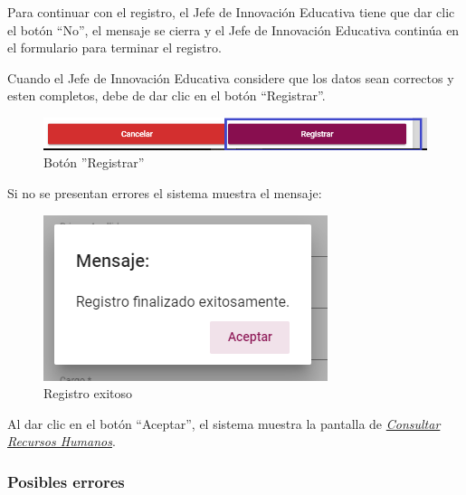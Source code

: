             Para continuar con el registro, el Jefe de Innovación Educativa tiene que  dar clic el botón “No”, el mensaje se cierra y el Jefe de Innovación Educativa continúa en el formulario para terminar el registro.

            Cuando el Jefe de Innovación Educativa considere que los datos sean correctos y esten completos, debe de dar clic en el botón “Registrar”.

            \begin{figure}[H]
                \centering
                \hypertarget{btnreg}{\includegraphics[width=0.7\linewidth]{images/SP1/BtnRegistrar}}
                \caption{Botón ''Registrar''}
                \label{btnreg}
            \end{figure}

            Si no se presentan errores el sistema muestra el mensaje:


             \begin{figure}[H]
                \centering
            \includegraphics[width=0.4\linewidth]{images/SP1/MSG5}
                \caption{Registro exitoso}
                \label{mensaje5}

            \end{figure}

            Al dar clic en el botón “Aceptar”, el sistema muestra la pantalla de  \hyperlink{consultarRH}{\textit{Consultar Recursos Humanos}}.

            \subsubsection{Posibles errores}

